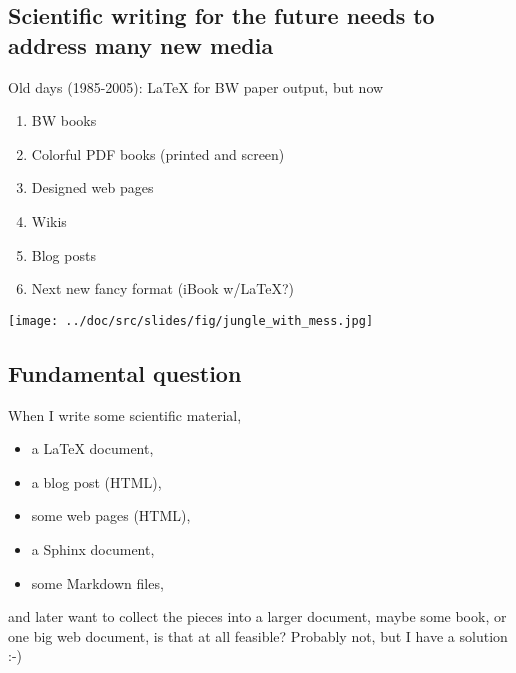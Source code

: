 \documentclass[%
oneside,                 %
final,                   %
10pt]{article}
\begin{document}
\subsection{Scientific writing for the future needs to address many new media}
Old days (1985-2005): {\LaTeX} for BW paper output, but now
\begin{enumerate}
  \item BW books
  \item Colorful PDF books (printed and screen)
  \item Designed web pages
  \item Wikis
  \item Blog posts
  \item Next new fancy format (iBook w/LaTeX?)
\end{enumerate}
\noindent
\vspace{6mm}
\centerline{\texttt{[image: ../doc/src/slides/fig/jungle\_with\_mess.jpg]}}
\vspace{6mm}
\subsection{Fundamental question}
When I write some scientific material,
\begin{itemize}
 \item a {\LaTeX} document,
 \item a blog post (HTML),
 \item some web pages (HTML),
 \item a Sphinx document,
 \item some Markdown files,
\end{itemize}
\noindent
and later want to collect the pieces into a larger document, maybe
some book, or one big web document, is that at all feasible?
Probably not, but I have a solution :-)
\end{document}
